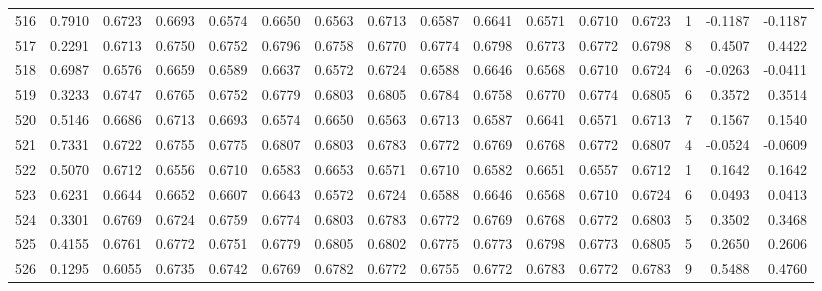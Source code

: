 \begin{tabular}{lrrrrrrrrrrrrrrr}
516 &      0.7910 &  0.6723 &  0.6693 &  0.6574 &  0.6650 &  0.6563 &  0.6713 &  0.6587 &  0.6641 &  0.6571 &   0.6710 &     0.6723 &      1 &                   -0.1187 &                    -0.1187 \\
517 &      0.2291 &  0.6713 &  0.6750 &  0.6752 &  0.6796 &  0.6758 &  0.6770 &  0.6774 &  0.6798 &  0.6773 &   0.6772 &     0.6798 &      8 &                    0.4507 &                     0.4422 \\
518 &      0.6987 &  0.6576 &  0.6659 &  0.6589 &  0.6637 &  0.6572 &  0.6724 &  0.6588 &  0.6646 &  0.6568 &   0.6710 &     0.6724 &      6 &                   -0.0263 &                    -0.0411 \\
519 &      0.3233 &  0.6747 &  0.6765 &  0.6752 &  0.6779 &  0.6803 &  0.6805 &  0.6784 &  0.6758 &  0.6770 &   0.6774 &     0.6805 &      6 &                    0.3572 &                     0.3514 \\
520 &      0.5146 &  0.6686 &  0.6713 &  0.6693 &  0.6574 &  0.6650 &  0.6563 &  0.6713 &  0.6587 &  0.6641 &   0.6571 &     0.6713 &      7 &                    0.1567 &                     0.1540 \\
521 &      0.7331 &  0.6722 &  0.6755 &  0.6775 &  0.6807 &  0.6803 &  0.6783 &  0.6772 &  0.6769 &  0.6768 &   0.6772 &     0.6807 &      4 &                   -0.0524 &                    -0.0609 \\
522 &      0.5070 &  0.6712 &  0.6556 &  0.6710 &  0.6583 &  0.6653 &  0.6571 &  0.6710 &  0.6582 &  0.6651 &   0.6557 &     0.6712 &      1 &                    0.1642 &                     0.1642 \\
523 &      0.6231 &  0.6644 &  0.6652 &  0.6607 &  0.6643 &  0.6572 &  0.6724 &  0.6588 &  0.6646 &  0.6568 &   0.6710 &     0.6724 &      6 &                    0.0493 &                     0.0413 \\
524 &      0.3301 &  0.6769 &  0.6724 &  0.6759 &  0.6774 &  0.6803 &  0.6783 &  0.6772 &  0.6769 &  0.6768 &   0.6772 &     0.6803 &      5 &                    0.3502 &                     0.3468 \\
525 &      0.4155 &  0.6761 &  0.6772 &  0.6751 &  0.6779 &  0.6805 &  0.6802 &  0.6775 &  0.6773 &  0.6798 &   0.6773 &     0.6805 &      5 &                    0.2650 &                     0.2606 \\
526 &      0.1295 &  0.6055 &  0.6735 &  0.6742 &  0.6769 &  0.6782 &  0.6772 &  0.6755 &  0.6772 &  0.6783 &   0.6772 &     0.6783 &      9 &                    0.5488 &                     0.4760 \\

\end{tabular}
